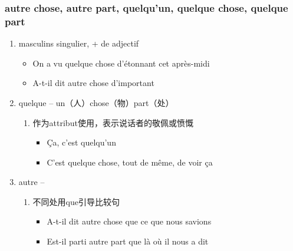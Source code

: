 \documentclass[UTF8]{report}
\begin{document}
\subsubsection{autre chose, autre part, quelqu’un, quelque chose, quelque part}
\begin{enumerate}
    \item masculins singulier, + de adjectif
    \begin{itemize}
        \item On a vu quelque chose d’étonnant cet après-midi
        \item A-t-il dit autre chose d’important 
    \end{itemize}
    \item quelque -- un（人）chose（物）part（处）
    \begin{enumerate}
        \item 作为attribut使用，表示说话者的敬佩或愤慨
        \begin{itemize}
            \item Ça, c’est quelqu’un
            \item C’est quelque chose, tout de même, de voir ça
        \end{itemize}
    \end{enumerate}
    \item autre --
    \begin{enumerate}
        \item 不同处用que引导比较句
        \begin{itemize}
            \item A-t-il dit autre chose que ce que nous savions
            \item Est-il parti autre part que là où il nous a dit 
        \end{itemize}
    \end{enumerate}
\end{enumerate}
\end{document}
